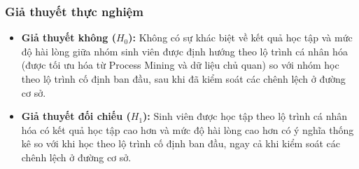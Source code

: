 \subsubsection{Giả thuyết thực nghiệm}
\begin{itemize}
    \item \textbf{Giả thuyết không ($H_0$):} Không có sự khác biệt về kết quả học tập và mức độ hài lòng giữa nhóm sinh viên được định hướng theo lộ trình cá nhân hóa (được tối ưu hóa từ Process Mining và dữ liệu chủ quan) so với nhóm học theo lộ trình cố định ban đầu, sau khi đã kiểm soát các chênh lệch ở đường cơ sở.
    \item \textbf{Giả thuyết đối chiếu ($H_1$):} Sinh viên được học tập theo lộ trình cá nhân hóa có kết quả học tập cao hơn và mức độ hài lòng cao hơn có ý nghĩa thống kê so với khi học theo lộ trình cố định ban đầu, ngay cả khi kiểm soát các chênh lệch ở đường cơ sở.
\end{itemize}
